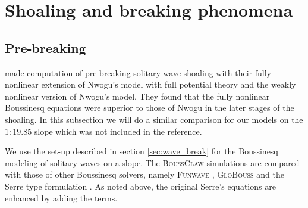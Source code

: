 \documentclass[review]{elsarticle}
\newcommand{\BoussClaw}{\textsc{BoussClaw} }
\begin{document}


\section{Shoaling and breaking phenomena}
\subsection{Pre-breaking}
\label{sec:num_breaking}
\citet{wei1995fully} made computation of pre-breaking solitary wave shoaling with
 their fully nonlinear extension of Nwogu's model with full potential 
theory and the weakly nonlinear version of Nwogu's model.
They found that the fully nonlinear Boussinesq equations were superior to those of Nwogu in the later stages of the shoaling.
In this subsection we will do a similar comparison for our models on the $1:19.85$ slope which was not included in the reference.
 
We use the set-up described in section \ref{sec:wave_break} for the Boussinesq modeling of solitary waves on a slope. 
The \BoussClaw simulations are compared
with those of other Boussinesq solvers, namely
 \textsc{Funwave} \citep{shi2012high}, \textsc{GloBouss} \citep{lovholt2010coupling} and the Serre type formulation \citep{Lovholt:2013a}.
As noted above, 
the original Serre's equations are enhanced by adding the \citet{schaffer1993boussinesq} terms. 
\end{document}
